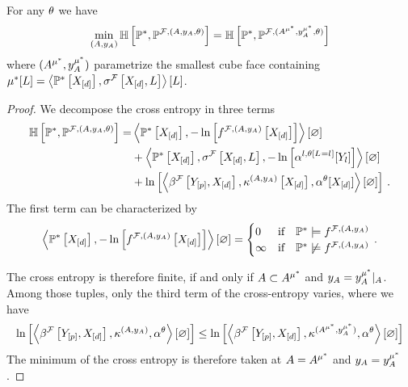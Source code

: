 \begin{lemma}
    \label{lem:minCrossEntropyHardparam}
    For any $\theta$ we have
    \begin{align*}
        \min_{(A,y_{A})} \mathbb{H}\left[\mathbb{P}^*,\mathbb{P}^{\mathcal{F},(A,y_{A},\theta)}\right]
        = \mathbb{H}\left[\mathbb{P}^*,\mathbb{P}^{\mathcal{F},(A^{\mu^*},y_{A}^{\mu^*},\theta)}\right]
    \end{align*}
    where $(A^{\mu^*},y_{A}^{\mu^*})$ parametrize the smallest cube face containing $\mu^*[L]=\left\langle \mathbb{P}^*\left[X_{[d]}\right],\sigma^{\mathcal{F}}\left[X_{[d]},L\right]\right\rangle \left[ L \right]$.
\end{lemma}
\begin{proof}
    We decompose the cross entropy in three terms
    \begin{align*}
        \mathbb{H}\left[\mathbb{P}^*,\mathbb{P}^{\mathcal{F},(A,y_{A},\theta)}\right]
        =& \left\langle \mathbb{P}^*\left[X_{[d]}\right],-\ln \left[ f^{\mathcal{F},(A,y_{A})}\left[X_{[d]}\right] \right]\right\rangle \left[ \varnothing \right] \\
        &+ \left\langle \mathbb{P}^*\left[X_{[d]}\right],\sigma^{\mathcal{F}}\left[X_{[d]},L\right],-\ln \left[ \alpha^{l,\theta\left[L_{}=l_{}\right]}[Y_{l}] \right]\right\rangle \left[ \varnothing \right] \\
        &+ \ln \left[ \left\langle \beta^{\mathcal{F}}\left[Y_{[p]},X_{[d]}\right],\kappa^{(A,y_{A})}\left[X_{[d]}\right],\alpha^{\theta}[X_{[d]}]\right\rangle \left[ \varnothing \right] \right] \, .
    \end{align*}
    The first term can be characterized by
    \begin{align*}
        \left\langle \mathbb{P}^*\left[X_{[d]}\right],-\ln \left[ f^{\mathcal{F},(A,y_{A})}\left[X_{[d]}\right] \right]\right\rangle \left[ \varnothing \right]
        =\begin{cases}
             0 & \text{if}\quad \mathbb{P}^*\models f^{\mathcal{F},(A,y_{A})} \\
             \infty & \text{if}\quad \mathbb{P}^*\not\models f^{\mathcal{F},(A,y_{A})}
        \end{cases} \, .
    \end{align*}

    The cross entropy is therefore finite, if and only if $A\subset A^{\mu^*}$ and $y_{A}={y_{A}^{\mu^*}}|_{A}$.
    Among those tuples, only the third term of the cross-entropy varies, where we have
    \begin{align*}
        \ln \left[ \left\langle \beta^{\mathcal{F}}\left[Y_{[p]},X_{[d]}\right],\kappa^{(A,y_{A})},\alpha^{\theta}\right\rangle \left[ \varnothing \right] \right] \leq \ln \left[ \left\langle \beta^{\mathcal{F}}\left[Y_{[p]},X_{[d]}\right],\kappa^{(A^{\mu^*},y_{A}^{\mu^*})},\alpha^{\theta}\right\rangle \left[ \varnothing \right] \right]
    \end{align*}
    The minimum of the cross entropy is therefore taken at $A=A^{\mu^*}$ and $y_{A}=y_{A}^{\mu^*}$.
\end{proof}

